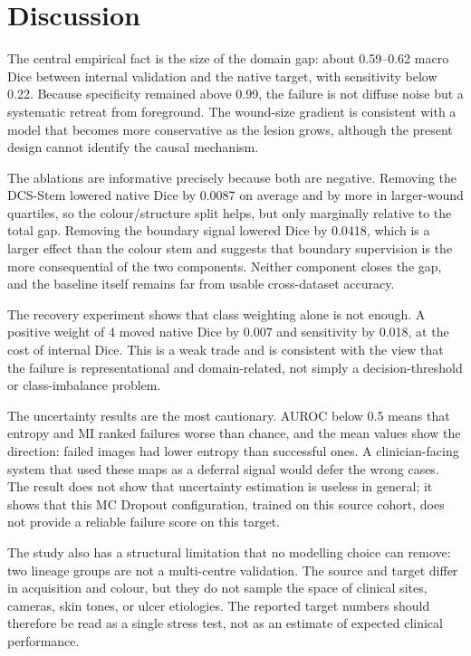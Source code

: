 \documentclass[conference]{IEEEtran}
\begin{document}
\section{Discussion}
\label{sec:discussion}

The central empirical fact is the size of the domain gap: about 0.59--0.62 macro Dice between internal validation and the native target, with sensitivity below 0.22. Because specificity remained above 0.99, the failure is not diffuse noise but a systematic retreat from foreground. The wound-size gradient is consistent with a model that becomes more conservative as the lesion grows, although the present design cannot identify the causal mechanism.

The ablations are informative precisely because both are negative. Removing the DCS-Stem lowered native Dice by 0.0087 on average and by more in larger-wound quartiles, so the colour/structure split helps, but only marginally relative to the total gap. Removing the boundary signal lowered Dice by 0.0418, which is a larger effect than the colour stem and suggests that boundary supervision is the more consequential of the two components. Neither component closes the gap, and the baseline itself remains far from usable cross-dataset accuracy.

The recovery experiment shows that class weighting alone is not enough. A positive weight of 4 moved native Dice by 0.007 and sensitivity by 0.018, at the cost of internal Dice. This is a weak trade and is consistent with the view that the failure is representational and domain-related, not simply a decision-threshold or class-imbalance problem.

The uncertainty results are the most cautionary. AUROC below 0.5 means that entropy and MI ranked failures worse than chance, and the mean values show the direction: failed images had lower entropy than successful ones. A clinician-facing system that used these maps as a deferral signal would defer the wrong cases. The result does not show that uncertainty estimation is useless in general; it shows that this MC Dropout configuration, trained on this source cohort, does not provide a reliable failure score on this target.

The study also has a structural limitation that no modelling choice can remove: two lineage groups are not a multi-centre validation. The source and target differ in acquisition and colour, but they do not sample the space of clinical sites, cameras, skin tones, or ulcer etiologies. The reported target numbers should therefore be read as a single stress test, not as an estimate of expected clinical performance.
\end{document}
